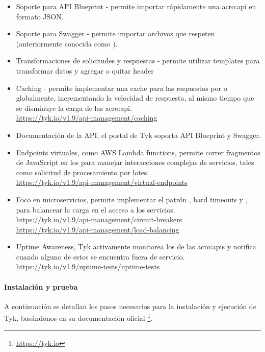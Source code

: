 \begin{itemize}
  \item Soporte para API Blueprint - permite importar rápidamente una \gls{acro:api} en formato JSON.
  \item Soporte para Swagger - permite importar archivos que respeten  (anteriormente conocida como ).
  \item Transformaciones de solicitudes y respuestas - permite utilizar templates para transformar datos y agregar o quitar header 
  \item Caching - permite implementar una cache para las respuestas por  o globalmente, incrementando la velocidad de respuesta, al mismo tiempo que se disminuye la carga de las \gls{acro:api}. \\
  \url{https://tyk.io/v1.9/api-management/caching}
  \item Documentación de la API, el portal de Tyk soporta API Blueprint y Swagger.
  \item Endpoints virtuales, como AWS Lambda functions, permite correr fragmentos de JavaScript en los  para manejar interacciones complejas de servicios, tales como solicitud de procesamiento por lotes. \\
  \url{https://tyk.io/v1.9/api-management/virtual-endpoints}
  \item Foco en microservicios, permite implementar el patrón , hard timeouts y , para balancear la carga en el acceso a los servicios. \\
  \url{https://tyk.io/v1.9/api-management/circuit-breakers} \\
  \url{https://tyk.io/v1.9/api-management/load-balancing}
  \item Uptime Awareness, Tyk activamente monitorea los  de las \glspl{acro:api} y notifica cuando alguno de estos se encuentra fuera de servicio. \\
  \url{https://tyk.io/v1.9/uptime-tests/uptime-tests}
\end{itemize}

\paragraph{Instalación y prueba}

A continuación se detallan los pasos necesarios para la instalación y ejecución de Tyk, basándonos en su documentación oficial \footnote{\url{https://tyk.io}}.

